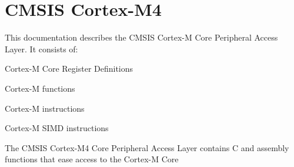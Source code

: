 \chapter{CMSIS Cortex-\/\+M4}
\hypertarget{index}{}\label{index}
This documentation describes the CMSIS Cortex-\/M Core Peripheral Access Layer. It consists of\+:


\begin{DoxyItemize}
\item Cortex-\/M Core Register Definitions
\item Cortex-\/M functions
\item Cortex-\/M instructions
\item Cortex-\/M SIMD instructions
\end{DoxyItemize}

The CMSIS Cortex-\/\+M4 Core Peripheral Access Layer contains C and assembly functions that ease access to the Cortex-\/M Core 
